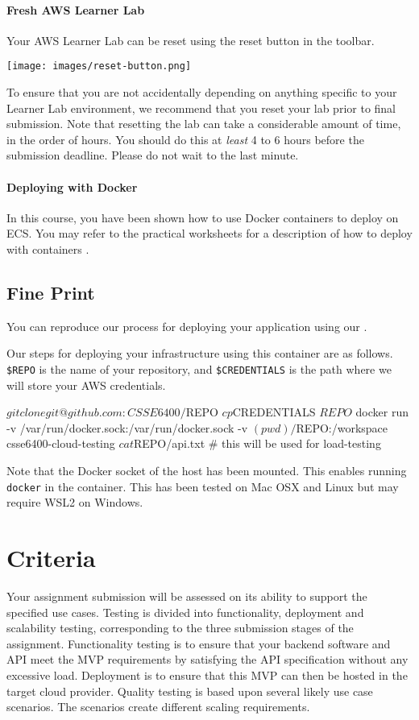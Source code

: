 \documentclass{csse4400}
\begin{document}
\paragraph{Fresh AWS Learner Lab}
Your AWS Learner Lab can be reset using the reset button in the toolbar.

\noindent
\texttt{[image: images/reset-button.png]}

\noindent
To ensure that you are not accidentally depending on anything specific to your Learner Lab environment, we recommend that you reset your lab prior to final submission. Note that resetting the lab can take a considerable amount of time, in the order of hours. You should do this at \textit{least} 4 to 6 hours before the submission deadline. Please do not wait to the last minute.

\paragraph{Deploying with Docker}
In this course, you have been shown how to use Docker containers to deploy on ECS. You may refer to the practical worksheets for a description of how to deploy with containers \cite{prac-week5}.

\subsection{Fine Print}
You can reproduce our process for deploying your application using our .

Our steps for deploying your infrastructure using this container are as follows.
\texttt{\$REPO} is the name of your repository, and
\texttt{\$CREDENTIALS} is the path where we will store your AWS credentials.
\begin{code}[language=shell]{}
$ git clone git@github.com:CSSE6400/$REPO
$ cp $CREDENTIALS $REPO
$ docker run -v /var/run/docker.sock:/var/run/docker.sock -v $(pwd)/$REPO:/workspace csse6400-cloud-testing
$ cat $REPO/api.txt # this will be used for load-testing
\end{code}

Note that the Docker socket of the host has been mounted. This enables running \texttt{docker} in the container. This has been tested on Mac OSX and Linux but may require WSL2 on Windows.


\section{Criteria}
Your assignment submission will be assessed on its ability to support the specified use cases.
Testing is divided into functionality, deployment and scalability testing, corresponding to the three submission stages of the assignment.
Functionality testing is to ensure that your backend software and API meet the MVP requirements by satisfying the API specification without any excessive load.
Deployment is to ensure that this MVP can then be hosted in the target cloud provider.
Quality testing is based upon several likely use case scenarios.
The scenarios create different scaling requirements.
\end{document}
